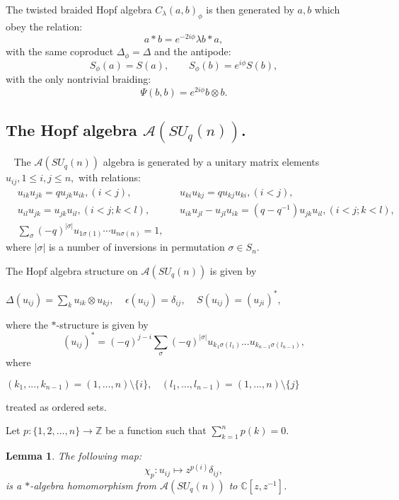 \documentclass[12pt]{amsart}
\newtheorem{lem}[thm]{Lemma}
\theoremstyle{definition}
\numberwithin{equation}{section}
\newcommand{\A}{\mathcal{A}}        %
\renewcommand{\a}{\chi}             %
\newcommand{\C}{\mathbb{C}}         %
\begin{document}
The twisted braided Hopf algebra $C_\lambda(a,b)_\phi$ is then generated
by $a,b$ which obey the relation:
$$ a \ast b = e^{- 2 i \phi } \lambda b \ast a, $$
with the same coproduct $\Delta_\phi = \Delta$ and
the antipode:
$$ S_\phi(a) = S(a), \qquad S_\phi(b) = e^{i\phi} S(b), $$
with the only nontrivial braiding:
$$ \Psi(b,b) = e^{2i\phi} b \otimes b. $$


\subsection{The Hopf algebra  $\A(SU_q(n))$.}\ \newline
The $\A(SU_q(n))$ algebra is generated by a unitary matrix elements $u_{ij}, 1 \leq i,j \leq n,$
with relations:
$$ 
\begin{aligned}
&u_{ik} u_{jk} = q u_{jk} u_{ik}, (i<j), &
& u_{ki} u_{kj} = q u_{kj} u_{ki}, (i < j), \\
& u_{il} u_{jk} = u_{jk} u_{il}, (i <j; k < l), &
& u_{ik} u_{jl} - u_{jl} u_{ik} = (q - q^{-1}) u_{jk} u_{il}, (i < j; k < l), \\
& \sum_\sigma (-q)^{|\sigma|} u_{1\sigma(1)} \cdots u_{n\sigma(n)} =1,&
\end{aligned}
$$
where $|\sigma|$ is a number of inversions in permutation $\sigma\in S_n$.


The Hopf algebra structure on $\mathcal{A}(SU_q(n))$ is given by 
\begin{center}
$\Delta(u_{ij})=\sum\limits_{k}u_{ik}\otimes u_{kj}, \ \ \ \ \ \epsilon(u_{ij})=\delta_{ij}, \ \ \ \ \ S(u_{ij})=(u_{ji})^{\ast},$
\end{center}
where the $\ast$-structure is given by
\begin{equation}
(u_{ij})^{\ast}=(-q)^{j-i}\sum\limits_{\sigma}(-q)^{|\sigma|}u_{k_1\sigma(l_1)}...u_{k_{n-1}\sigma(l_{n-1})},
\end{equation}
where
\begin{center}
$(k_1,...,k_{n-1})=(1,...,n)\setminus\{i\}, \ \ \ \ (l_1,...,l_{n-1})=(1,...,n)\setminus\{j\}$
\end{center}
treated as ordered sets.


Let $p: \{1,2,\ldots,n\} \to {\mathbb Z}$ be a function such that $\sum\limits_{k=1}^{n} p(k) = 0$.

\begin{lem}The following map:
$$ \a_p: u_{ij} \mapsto z^{p(i)} \delta_{ij}, $$
is a $\ast$-algebra homomorphism from $\A(SU_q(n))$ to $\C[z,z^{-1}]$.
\end{lem}
\end{document}
